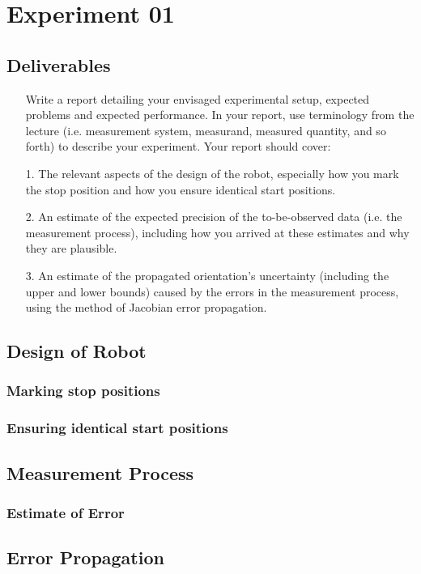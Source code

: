

    \chapter{Experiment 01}
    \section{Deliverables}
    \begin{itemize}
        \item[] Write a report detailing your envisaged experimental setup, expected problems and expected performance. In your report, use terminology from the lecture (i.e. measurement system, measurand, measured quantity, and so forth) to describe your experiment. Your report should cover:
    \end{itemize}
    
    \begin{itemize}
        \item[1.] The relevant aspects of the design of the robot, especially how you mark the stop position and how you ensure identical start positions.
        \item[2.] An estimate of the expected precision of the to-be-observed data (i.e. the measurement process), including how you arrived at these estimates and why they are plausible.
        \item[3.] An estimate of the propagated orientation’s uncertainty (including the upper and lower bounds) caused by the errors in the measurement process, using the method of Jacobian error propagation.
    \end{itemize}
    
    \section{Design of Robot}
    {
    \subsection{Marking stop positions}
    \subsection{Ensuring identical start positions}
    }
    
    \section{Measurement Process}
    {
    \subsection{Estimate of Error}
    }
    
    \section{Error Propagation}
    {
    
    }
    
    

